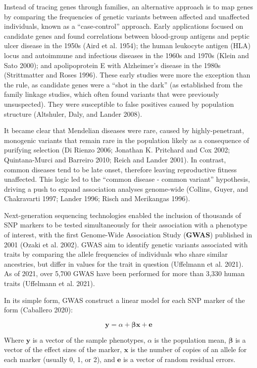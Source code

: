\documentclass[
]{book}
\begin{document}
Instead of tracing genes through families, an alternative approach is to map genes by comparing the frequencies of genetic variants between affected and unaffected individuals, known as a ``case-control'' approach. Early applications focused on candidate genes and found correlations between blood-group antigens and peptic ulcer disease in the 1950s (Aird et al. 1954); the human leukocyte antigen (HLA) locus and autoimmune and infectious diseases in the 1960s and 1970s (Klein and Sato 2000); and apolipoprotein E with Alzheimer's disease in the 1980s (Strittmatter and Roses 1996). These early studies were more the exception than the rule, as candidate genes were a ``shot in the dark'' (as established from the family linkage studies, which often found variants that were previously unsuspected). They were susceptible to false positives caused by population structure (Altshuler, Daly, and Lander 2008).

It became clear that Mendelian diseases were rare, caused by highly-penetrant, monogenic variants that remain rare in the population likely as a consequence of purifying selection (Di Rienzo 2006; Jonathan K. Pritchard and Cox 2002; Quintana-Murci and Barreiro 2010; Reich and Lander 2001). In contrast, common diseases tend to be late onset, therefore leaving reproductive fitness unaffected. This logic led to the ``common disease - common variant'' hypothesis, driving a push to expand association analyses genome-wide (Collins, Guyer, and Chakravarti 1997; Lander 1996; Risch and Merikangas 1996).

Next-generation sequencing technologies enabled the inclusion of thousands of SNP markers to be tested simultaneously for their association with a phenotype of interest, with the first Genome-Wide Association Study (\textbf{GWAS}) published in 2001 (Ozaki et al. 2002). GWAS aim to identify genetic variants associated with traits by comparing the allele frequencies of individuals who share similar ancestries, but differ in values for the trait in question (Uffelmann et al. 2021). As of 2021, over 5,700 GWAS have been performed for more than 3,330 human traits (Uffelmann et al. 2021).

In its simple form, GWAS construct a linear model for each SNP marker of the form (Caballero 2020):

\begin{equation}
\textbf{y} = \alpha + \pmb{\beta} \textbf{x} + \textbf{e} \label{eq:gwassimp}
\end{equation}

Where \(\textbf{y}\) is a vector of the sample phenotypes, \(\alpha\) is the population mean, \(\pmb{\beta}\) is a vector of the effect sizes of the marker, \(\textbf{x}\) is the number of copies of an allele for each marker (usually 0, 1, or 2), and \(\textbf{e}\) is a vector of random residual errors.
\end{document}
